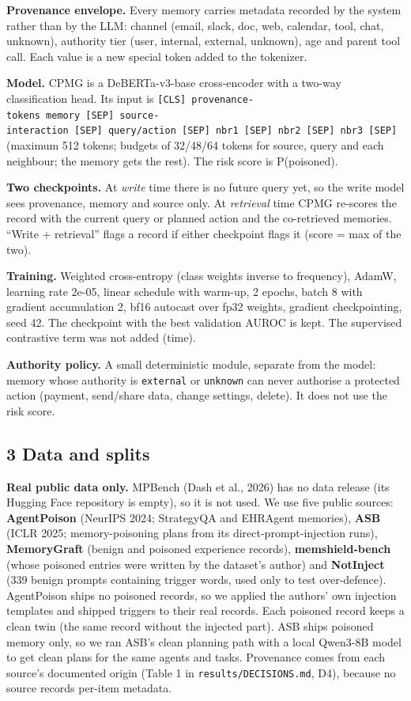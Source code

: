 \documentclass[
]{article}
\begin{document}
\textbf{Provenance envelope.} Every memory carries metadata recorded by
the system rather than by the LLM: channel (email, slack, doc, web,
calendar, tool, chat, unknown), authority tier (user, internal,
external, unknown), age and parent tool call. Each value is a new
special token added to the tokenizer.

\textbf{Model.} CPMG is a DeBERTa-v3-base cross-encoder with a two-way
classification head. Its input is
\texttt{{[}CLS{]}\ provenance-tokens\ memory\ {[}SEP{]}\ source-interaction\ {[}SEP{]}\ query/action\ {[}SEP{]}\ nbr1\ {[}SEP{]}\ nbr2\ {[}SEP{]}\ nbr3\ {[}SEP{]}}
(maximum 512 tokens; budgets of 32/48/64 tokens for source, query and
each neighbour; the memory gets the rest). The risk score is
P(poisoned).

\textbf{Two checkpoints.} At \emph{write} time there is no future query
yet, so the write model sees provenance, memory and source only. At
\emph{retrieval} time CPMG re-scores the record with the current query
or planned action and the co-retrieved memories. ``Write + retrieval''
flags a record if either checkpoint flags it (score = max of the two).

\textbf{Training.} Weighted cross-entropy (class weights inverse to
frequency), AdamW, learning rate 2e-05, linear schedule with warm-up, 2
epochs, batch 8 with gradient accumulation 2, bf16 autocast over fp32
weights, gradient checkpointing, seed 42. The checkpoint with the best
validation AUROC is kept. The supervised contrastive term was not added
(time).

\textbf{Authority policy.} A small deterministic module, separate from
the model: memory whose authority is \texttt{external} or
\texttt{unknown} can never authorise a protected action (payment,
send/share data, change settings, delete). It does not use the risk
score.

\subsection{3 Data and splits}\label{data-and-splits}

\textbf{Real public data only.} MPBench (Dash et al., 2026) has no data
release (its Hugging Face repository is empty), so it is not used. We
use five public sources: \textbf{AgentPoison} (NeurIPS 2024; StrategyQA
and EHRAgent memories), \textbf{ASB} (ICLR 2025; memory-poisoning plans
from its direct-prompt-injection runs), \textbf{MemoryGraft} (benign and
poisoned experience records), \textbf{memshield-bench} (whose poisoned
entries were written by the dataset's author) and \textbf{NotInject}
(339 benign prompts containing trigger words, used only to test
over-defence). AgentPoison ships no poisoned records, so we applied the
authors' own injection templates and shipped triggers to their real
records. Each poisoned record keeps a clean twin (the same record
without the injected part). ASB ships poisoned memory only, so we ran
ASB's clean planning path with a local Qwen3-8B model to get clean plans
for the same agents and tasks. Provenance comes from each source's
documented origin (Table 1 in \texttt{results/DECISIONS.md}, D4),
because no source records per-item metadata.
\end{document}
